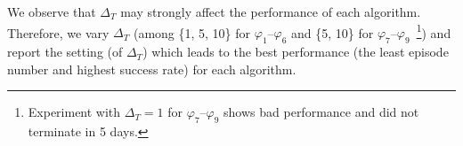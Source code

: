 %
We observe that $\Delta_{T}$ may strongly affect the performance of each algorithm.
Therefore, we
vary $\Delta_{T}$ (among \{1, 5, 10\} for $\varphi_1$--$\varphi_6$ and \{5, 10\} for $\varphi_7$--$\varphi_9$~\footnote{Experiment with $\Delta_{T}=1$ for $\varphi_7$--$\varphi_9$ shows bad performance and did not terminate in 5 days.}) and report the setting (of $\Delta_{T}$) which leads to the best performance (the least episode number and highest success rate) for each algorithm.



